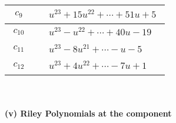 \documentclass[1p]{elsarticle_modified}
\theoremstyle{definition}
\begin{document}
\begin{tabular}{m{50pt}|m{274pt}}
\hline $$\begin{aligned}c_{9}\end{aligned}$$&$\begin{aligned}
&u^{23}+15 u^{22}+\cdots+51 u+5
\end{aligned}$\\
\hline $$\begin{aligned}c_{10}\end{aligned}$$&$\begin{aligned}
&u^{23}- u^{22}+\cdots+40 u-19
\end{aligned}$\\
\hline $$\begin{aligned}c_{11}\end{aligned}$$&$\begin{aligned}
&u^{23}-8 u^{21}+\cdots- u-5
\end{aligned}$\\
\hline $$\begin{aligned}c_{12}\end{aligned}$$&$\begin{aligned}
&u^{23}+4 u^{22}+\cdots-7 u+1
\end{aligned}$\\
\hline
\end{tabular}\\~\\
\newpage\renewcommand{\arraystretch}{1}
\flushleft \textbf{(v) Riley Polynomials at the component}\newline \\
\end{document}
